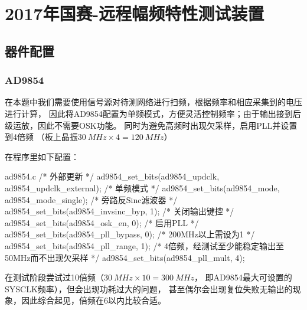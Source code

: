 \section{2017年国赛-远程幅频特性测试装置}
\subsection{器件配置}
\subsubsection{AD9854}
在本题中我们需要使用信号源对待测网络进行扫频，根据频率和相应采集到的电压进行计算，
因此将AD9854配置为单频模式，方便灵活控制频率；由于输出接到后级运放，因此不需要OSK功能。
同时为避免高频时出现欠采样，启用PLL并设置到4倍频
（板上晶振$\SI{30}{MHz}\times 4 = \SI{120}{MHz}$）

在程序里如下配置：

\begin{cbox}{ad9854.c}
  /* 外部更新 */
  ad9854_set_bits(ad9854_updclk, ad9854_updclk_external);
  /* 单频模式 */
  ad9854_set_bits(ad9854_mode, ad9854_mode_single);
  /* 旁路反Sinc滤波器 */
  ad9854_set_bits(ad9854_invsinc_byp, 1);
  /* 关闭输出键控 */
  ad9854_set_bits(ad9854_osk_en, 0);
  /* 启用PLL */
  ad9854_set_bits(ad9854_pll_bypass, 0);
  /* 200MHz以上需设为1 */
  ad9854_set_bits(ad9854_pll_range, 1);
  /* 4倍频，经测试至少能稳定输出至50MHz而不出现欠采样 */
  ad9854_set_bits(ad9854_pll_mult, 4);
\end{cbox}

在测试阶段尝试过10倍频（$\SI{30}{MHz}\times 10 = \SI{300}{MHz}$，
即AD9854最大可设置的SYSCLK频率），但会出现功耗过大的问题，
甚至偶尔会出现复位失败无输出的现象，因此综合起见，倍频在6以内比较合适。